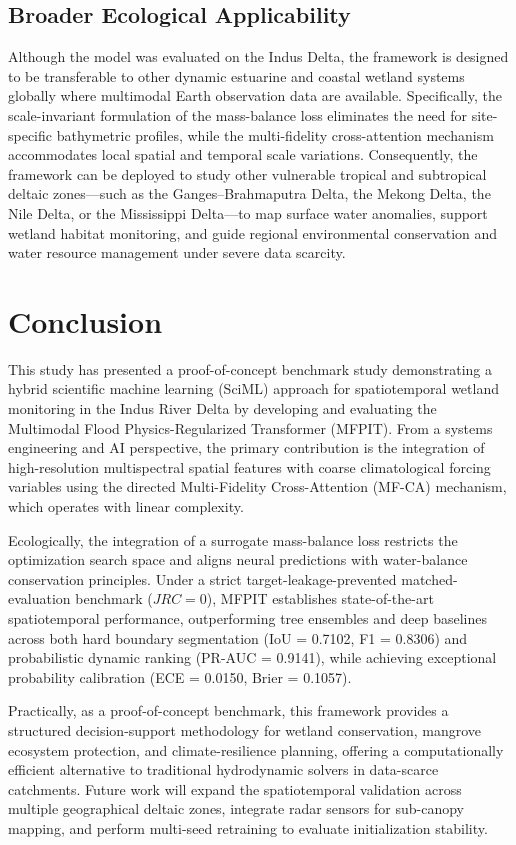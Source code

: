 \documentclass[journal]{IEEEtran}
\begin{document}
\subsection{Broader Ecological Applicability}
Although the model was evaluated on the Indus Delta, the framework is designed to be transferable to other dynamic estuarine and coastal wetland systems globally where multimodal Earth observation data are available. Specifically, the scale-invariant formulation of the mass-balance loss eliminates the need for site-specific bathymetric profiles, while the multi-fidelity cross-attention mechanism accommodates local spatial and temporal scale variations. Consequently, the framework can be deployed to study other vulnerable tropical and subtropical deltaic zones---such as the Ganges--Brahmaputra Delta, the Mekong Delta, the Nile Delta, or the Mississippi Delta---to map surface water anomalies, support wetland habitat monitoring, and guide regional environmental conservation and water resource management under severe data scarcity.

\section{Conclusion}
This study has presented a proof-of-concept benchmark study demonstrating a hybrid scientific machine learning (SciML) approach for spatiotemporal wetland monitoring in the Indus River Delta by developing and evaluating the Multimodal Flood Physics-Regularized Transformer (MFPIT). From a systems engineering and AI perspective, the primary contribution is the integration of high-resolution multispectral spatial features with coarse climatological forcing variables using the directed Multi-Fidelity Cross-Attention (MF-CA) mechanism, which operates with linear complexity. 

Ecologically, the integration of a surrogate mass-balance loss restricts the optimization search space and aligns neural predictions with water-balance conservation principles. Under a strict target-leakage-prevented matched-evaluation benchmark ($JRC=0$), MFPIT establishes state-of-the-art spatiotemporal performance, outperforming tree ensembles and deep baselines across both hard boundary segmentation (IoU = 0.7102, F1 = 0.8306) and probabilistic dynamic ranking (PR-AUC = 0.9141), while achieving exceptional probability calibration (ECE = 0.0150, Brier = 0.1057). 

Practically, as a proof-of-concept benchmark, this framework provides a structured decision-support methodology for wetland conservation, mangrove ecosystem protection, and climate-resilience planning, offering a computationally efficient alternative to traditional hydrodynamic solvers in data-scarce catchments. Future work will expand the spatiotemporal validation across multiple geographical deltaic zones, integrate radar sensors for sub-canopy mapping, and perform multi-seed retraining to evaluate initialization stability.
\end{document}
